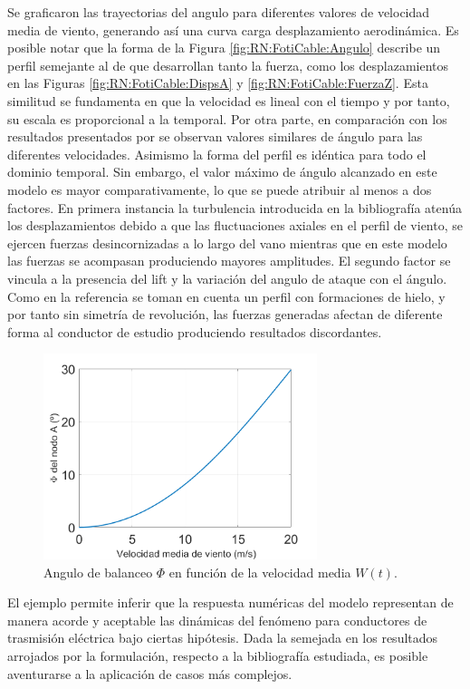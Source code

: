 Se graficaron las trayectorias del angulo para diferentes valores de velocidad media de viento, generando así una curva carga desplazamiento aerodinámica. Es posible notar que la forma de la Figura \ref{fig:RN:FotiCable:Angulo} describe un perfil semejante al de que desarrollan tanto la fuerza, como los desplazamientos en las Figuras \ref{fig:RN:FotiCable:DispsA} y \ref{fig:RN:FotiCable:FuerzaZ}. Esta similitud se fundamenta en que la velocidad es lineal con el tiempo y por tanto, su escala es proporcional a la temporal.
Por otra parte, en comparación con los resultados presentados por \cite{foti2018finite} se observan valores similares de ángulo para las diferentes velocidades. Asimismo la forma del perfil es idéntica para todo el dominio temporal. Sin embargo, el valor máximo de ángulo alcanzado en este modelo es mayor comparativamente, lo que se puede atribuir al menos a dos factores. En primera instancia la turbulencia introducida en la bibliografía atenúa los desplazamientos debido a que las fluctuaciones axiales en el perfil de viento, se ejercen fuerzas desincornizadas a lo largo del vano mientras que en este modelo las fuerzas se acompasan produciendo mayores amplitudes. El segundo factor se vincula a la presencia del lift y la variación del angulo de ataque con el ángulo. Como en la referencia \cite{foti2018finite} se toman en cuenta un perfil con formaciones de hielo, y por tanto sin simetría de revolución, las fuerzas generadas afectan de diferente forma al conductor de estudio produciendo resultados discordantes. 


\begin{figure}[htbp]
\centering
\includegraphics[width=80mm]{./imagenes/ResultadosNumericos/SimpleCable/Angulo_Foti.png}
\caption{Angulo de balanceo $\Phi$ en función de la velocidad media $W(t)$.}
\label{fig:CableAngulo}
\end{figure}

El ejemplo permite inferir que la respuesta numéricas del modelo representan de manera acorde y aceptable las dinámicas del fenómeno para conductores de trasmisión eléctrica bajo ciertas hipótesis. Dada la semejada en los resultados arrojados por la formulación, respecto a la bibliografía estudiada, es posible aventurarse a la aplicación de casos más complejos. 




